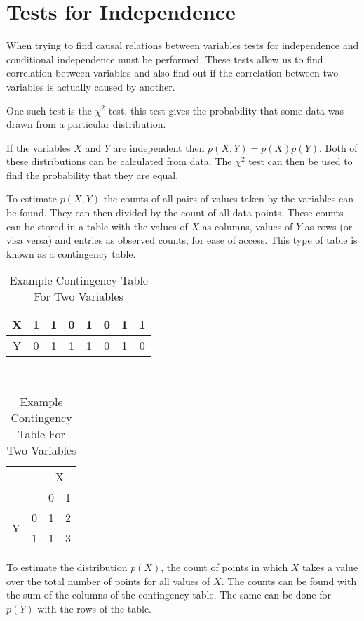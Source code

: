 \documentclass{UoYCSproject}
\begin{document}
\section{Tests for Independence}
When trying to find causal relations between variables tests for independence and conditional independence must be performed. These tests allow us to find correlation between variables and also find out if the correlation between two variables is actually caused by another.

One such test is the $\chi^2$ test, this test gives the probability that some data was drawn from a particular distribution.

If the variables $X$ and $Y$ are independent then $p(X,Y) = p(X)p(Y)$. Both of these distributions can be calculated from data. The $\chi^2$ test can then be used to find the probability that they are equal.

To estimate $p(X,Y)$ the counts of all pairs of values taken by the variables can be found. They can then divided by the count of all data points. These counts can be stored in a table with the values of $X$ as columns, values of $Y$ as rows (or visa versa) and entries as observed counts, for ease of access. This type of table is known as a contingency table.

\begin{table}[h!]
	\centering
	\begin{tabular}{c|c c c c c c c}
		X & 1 & 1 & 0 & 1 & 0 & 1 & 1\\ \hline
		Y & 0 & 1 & 1 & 1 & 0 & 1 & 0\\
	\end{tabular}
\\
	\begin{tabular}{c|c|cc|}
		\multicolumn{2}{c}{}& \multicolumn{2}{c}{X} \\ \cline{3-4}
		\multicolumn{2}{c|}{} & 0 & 1 \\ \cline{2-4}
		\multirow{2}{*}{Y} & 0 & 1 & 2\\
		& 1 & 1 & 3 \\
		\cline{2-4} 
	\end{tabular}
\caption{Example Contingency Table For Two Variables}
\end{table}

To estimate the distribution $p(X)$, the count of points in which $X$ takes a value over the total number of points for all values of $X$. The counts can be found with the sum of the columns of the contingency table. The same can be done for $p(Y)$ with the rows of the table.\\
\end{document}

